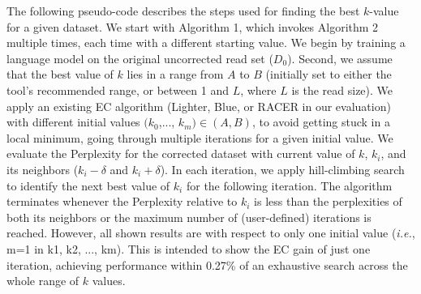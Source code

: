 The following pseudo-code describes the steps used for finding the best $k$-value for a given dataset. We start with Algorithm 1, which invokes Algorithm 2 multiple times, each time with a different starting value. We begin by training a language model on the original uncorrected read set ($D_0$). Second, we assume that the best value of $k$ lies in a range from $A$ to $B$ (initially set to either the tool's recommended range, or between 1 and $L$, where $L$ is the read size).
We apply an existing EC algorithm (Lighter, Blue, or RACER in our evaluation) with different initial values $(k_{0}$,..., $k_{m}) \in (A, B)$, to avoid getting stuck in a local minimum, going through multiple iterations for a given initial value. We evaluate the Perplexity for the corrected dataset with current value of $k$, $k_i$, and its neighbors ($k_i-\delta$ and $k_i+\delta$). In each iteration, we apply hill-climbing search to identify the next best value of $k_{i}$ for the following iteration. The algorithm terminates whenever the Perplexity relative to $k_i$ is less than the perplexities of both its neighbors or the maximum number of (user-defined) iterations is reached. However, all shown results are with respect to only one initial value (\textit{i.e.}, m=1 in k1, k2, ..., km).
This is intended to show the EC gain of just one iteration, achieving performance within 0.27\% of an exhaustive search across the whole range of $k$ values. %


